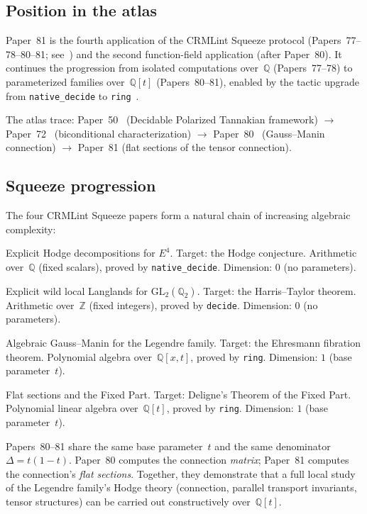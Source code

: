 \documentclass[11pt]{article}
\theoremstyle{plain}
\theoremstyle{definition}
\theoremstyle{remark}
\newcommand{\Z}{\mathbb{Z}}
\newcommand{\Q}{\mathbb{Q}}
\newcommand{\GL}{\mathrm{GL}}
\begin{document}
\subsection{Position in the atlas}\label{sec:atlas}

Paper~81 is the fourth application of the CRMLint Squeeze
protocol (Papers~77--78--80--81;
see~\cite{Paper77,Paper78,Paper80}) and the second function-field
application (after Paper~80).  It continues the progression
from isolated computations over~$\Q$ (Papers~77--78) to
parameterized families over~$\Q[t]$ (Papers~80--81),
enabled by the tactic upgrade from \texttt{native\_decide}
to \texttt{ring}~\cite{Paper80}.

The atlas trace:
Paper~50~\cite{Paper50} (Decidable Polarized Tannakian framework)
$\to$ Paper~72~\cite{Paper72} (biconditional characterization)
$\to$ Paper~80~\cite{Paper80} (Gauss--Manin connection)
$\to$ Paper~81 (flat sections of the tensor connection).

\subsection{Squeeze progression}\label{sec:progression}

The four CRMLint Squeeze papers form a natural chain of
increasing algebraic complexity:

\begin{description}[nosep]
\item[Paper~77] Explicit Hodge decompositions for $E^4$.
  Target: the Hodge conjecture.  Arithmetic over~$\Q$
  (fixed scalars), proved by \texttt{native\_decide}.
  Dimension: $0$ (no parameters).
\item[Paper~78] Explicit wild local Langlands for $\GL_2(\Q_2)$.
  Target: the Harris--Taylor theorem.  Arithmetic
  over~$\Z$ (fixed integers), proved by \texttt{decide}.
  Dimension: $0$ (no parameters).
\item[Paper~80] Algebraic Gauss--Manin for the Legendre family.
  Target: the Ehresmann fibration theorem.  Polynomial
  algebra over~$\Q[x, t]$, proved by \texttt{ring}.
  Dimension: $1$ (base parameter~$t$).
\item[Paper~81] Flat sections and the Fixed Part.
  Target: Deligne's Theorem of the Fixed Part.  Polynomial
  linear algebra over~$\Q[t]$, proved by \texttt{ring}.
  Dimension: $1$ (base parameter~$t$).
\end{description}

Papers~80--81 share the same base parameter~$t$ and the same
denominator $\Delta = t(1-t)$.  Paper~80 computes the
connection \emph{matrix}; Paper~81 computes the connection's
\emph{flat sections}.  Together, they demonstrate that a
full local study of the Legendre family's Hodge theory
(connection, parallel transport invariants, tensor
structures) can be carried out constructively over~$\Q[t]$.
\end{document}
